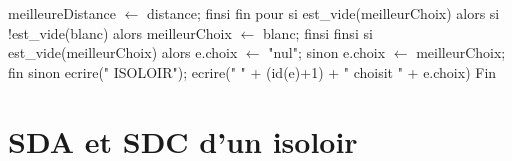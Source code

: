 \documentclass[12pt]{article} %
\begin{document}
\begin{algorithm}
\begin{algorithmic}[1]
		\State \hspace{\algorithmicindent}\hspace{\algorithmicindent}\hspace{\algorithmicindent} meilleureDistance $\leftarrow$ distance;
		\State \hspace{\algorithmicindent}\hspace{\algorithmicindent} finsi 
		\State \hspace{\algorithmicindent} fin pour
		\State \hspace{\algorithmicindent} si est\_vide(meilleurChoix) alors
		\State \hspace{\algorithmicindent} \hspace{\algorithmicindent} si !est\_vide(blanc) alors
		\State \hspace{\algorithmicindent} \hspace{\algorithmicindent} \hspace{\algorithmicindent} meilleurChoix $\leftarrow$ blanc;
		\State \hspace{\algorithmicindent} \hspace{\algorithmicindent} finsi
		\State \hspace{\algorithmicindent} finsi
		\State \hspace{\algorithmicindent} si est\_vide(meilleurChoix) alors
		\State \hspace{\algorithmicindent} \hspace{\algorithmicindent} e.choix $\leftarrow$ "nul";
		\State\hspace{\algorithmicindent} sinon
		\State\hspace{\algorithmicindent}\hspace{\algorithmicindent} e.choix $\leftarrow$ meilleurChoix;
		\State\hspace{\algorithmicindent} fin sinon
		\State ecrire("   ISOLOIR");
		\State ecrire("      " + (id(e)+1) + " choisit " + e.choix)
		\State Fin
	\end{algorithmic}
\end{algorithm}

\newpage
\section*{SDA et SDC d'un isoloir}
\end{document}
